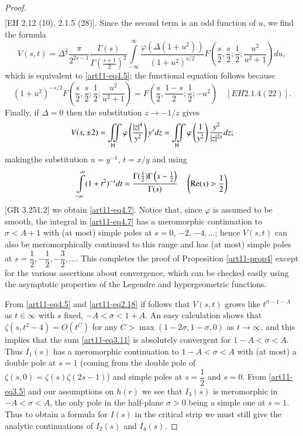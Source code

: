 \begin{proof}
\begin{align*}
\end{align*}
[EH 2.12 (10), 2.1.5 (28)]. Since the second term is an odd function of $u$, we find the formula 
$$
V(s,t) = \Delta^{\frac{s}{2}} \frac{\pi}{2^{2s-1}} \frac{\Gamma (s)}{\Gamma \left(\frac{s+1}{2} \right)^2} \int\limits^\infty_{-\infty} \frac{\varphi (\Delta (1+u^2))}{(1+u^2)^{s/2}} F\left(\frac{s}{2} , \frac{s}{2}; \frac{1}{2} ;\frac{u^2}{u^2+1}\right) du, 
$$
which is equivalent to \eqref{art11-eq4.5}; the functional equation follows because 
$$
(1+u^2)^{-s/2} F \left(\frac{s}{2}, \frac{s}{2}; \frac{1}{2}; \frac{u^2}{u^2+1} \right) = F \left(\frac{s}{2}, \frac{1-s}{2}; \frac{1}{2} ; - u^2 \right) \quad [EH 2.1.  4(22)].
$$
Finally, if $\Delta =0$ then the substitution $z \to -1/z$ gives
$$
V(s, \pm 2) =  \iint\limits_{\mathsf{H}} \varphi \left(\frac{|z|^4}{y^2} \right) y^s  dz = \iint\limits_{\mathsf{H}} \varphi \left(\frac{1}{y^2} \right) \frac{y^2 }{|z|^{2s}} dz; 
$$
making\pageoriginale the substitution $u = y^{-1}$, $t = x/ y$ and using 
$$
\int\limits^\infty_{-\infty} (1+t^2)^{-s} dt = \frac{\Gamma (\frac{1}{2}) \Gamma \left(s - \frac{1}{2} \right)}{\Gamma(s)} \quad \left(\operatorname{Re} (s) > \frac{1}{2} \right)
$$
[GR 3.251.2] we obtain \eqref{art11-eq4.7}. Notice that, since $\varphi$ is assumed to be smooth, the integral in \eqref{art11-eq4.7} has a meromorphic continuation to $\sigma < A +1$ with (at most) simple poles at $s =0$, $-2$, $-4, \ldots$; hence $V(s,t)$ can also be meromorphically continued to this range and has (at most) simple poles at $s =\dfrac{1}{2}, -\dfrac{1}{2}, - \dfrac{3}{2},\ldots$. This completes the proof of Proposition \eqref{art11-prop4} except for the various assertions about convergence, which can be checked easily using the asymptotic properties of the Legendre and hypergeometric functions.

From \eqref{art11-eq4.5} and \eqref{art11-eq2.18} if follows that $V(s,t)$ grows like $t^{\sigma -1 -A}$ as $t \in \infty$ with $s$ fixed, $-A < \sigma < 1+ A$. An easy calculation shows that $\zeta(s,t^2 -4) = O(t^C)$ for any $C > \max (1 - 2 \sigma, 1 - \sigma, 0)$ as $t \to \infty$, and this implies that the sum \eqref{art11-eq3.11} is absolutely convergent for $1 - A < \sigma < A$. Thus $I_1 (s)$ has a meromorphic continuation to $1 - A < \sigma < A$ with (at most) a double pole at $s =1$ (coming from the double pole of $\zeta(s,0) = \zeta (s) \zeta(2s-1)$) and simple poles at $s = \dfrac{1}{2}$ and $s =0$. From \eqref{art11-eq3.5} and our assumptions on $h(r)$ we see that $I_3(s)$ is meromorphic in $-A < \sigma < A$, the only pole in the half-plane $\sigma >0$ being a simple one at $s =1$. Thus to obtain a formula for $I(s)$ in the critical strip we must still give the analytic continuations of $I_2 (s)$  and $I_4 (s)$.


\end{proof}
